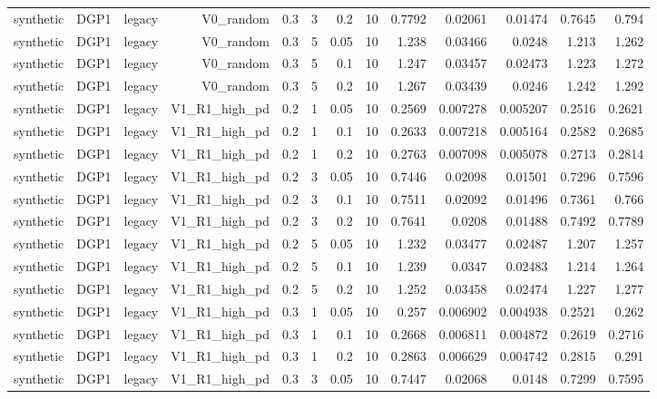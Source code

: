 \begin{table}[htbp]
\begin{tabular}{lrrrrrrrrrrrr}
    synthetic & DGP1 & legacy & V0\_random & 0.3 & 3 & 0.2 & 10 & 0.7792 & 0.02061 & 0.01474 & 0.7645 & 0.794 \\
    synthetic & DGP1 & legacy & V0\_random & 0.3 & 5 & 0.05 & 10 & 1.238 & 0.03466 & 0.0248 & 1.213 & 1.262 \\
    synthetic & DGP1 & legacy & V0\_random & 0.3 & 5 & 0.1 & 10 & 1.247 & 0.03457 & 0.02473 & 1.223 & 1.272 \\
    synthetic & DGP1 & legacy & V0\_random & 0.3 & 5 & 0.2 & 10 & 1.267 & 0.03439 & 0.0246 & 1.242 & 1.292 \\
    synthetic & DGP1 & legacy & V1\_R1\_high\_pd & 0.2 & 1 & 0.05 & 10 & 0.2569 & 0.007278 & 0.005207 & 0.2516 & 0.2621 \\
    synthetic & DGP1 & legacy & V1\_R1\_high\_pd & 0.2 & 1 & 0.1 & 10 & 0.2633 & 0.007218 & 0.005164 & 0.2582 & 0.2685 \\
    synthetic & DGP1 & legacy & V1\_R1\_high\_pd & 0.2 & 1 & 0.2 & 10 & 0.2763 & 0.007098 & 0.005078 & 0.2713 & 0.2814 \\
    synthetic & DGP1 & legacy & V1\_R1\_high\_pd & 0.2 & 3 & 0.05 & 10 & 0.7446 & 0.02098 & 0.01501 & 0.7296 & 0.7596 \\
    synthetic & DGP1 & legacy & V1\_R1\_high\_pd & 0.2 & 3 & 0.1 & 10 & 0.7511 & 0.02092 & 0.01496 & 0.7361 & 0.766 \\
    synthetic & DGP1 & legacy & V1\_R1\_high\_pd & 0.2 & 3 & 0.2 & 10 & 0.7641 & 0.0208 & 0.01488 & 0.7492 & 0.7789 \\
    synthetic & DGP1 & legacy & V1\_R1\_high\_pd & 0.2 & 5 & 0.05 & 10 & 1.232 & 0.03477 & 0.02487 & 1.207 & 1.257 \\
    synthetic & DGP1 & legacy & V1\_R1\_high\_pd & 0.2 & 5 & 0.1 & 10 & 1.239 & 0.0347 & 0.02483 & 1.214 & 1.264 \\
    synthetic & DGP1 & legacy & V1\_R1\_high\_pd & 0.2 & 5 & 0.2 & 10 & 1.252 & 0.03458 & 0.02474 & 1.227 & 1.277 \\
    synthetic & DGP1 & legacy & V1\_R1\_high\_pd & 0.3 & 1 & 0.05 & 10 & 0.257 & 0.006902 & 0.004938 & 0.2521 & 0.262 \\
    synthetic & DGP1 & legacy & V1\_R1\_high\_pd & 0.3 & 1 & 0.1 & 10 & 0.2668 & 0.006811 & 0.004872 & 0.2619 & 0.2716 \\
    synthetic & DGP1 & legacy & V1\_R1\_high\_pd & 0.3 & 1 & 0.2 & 10 & 0.2863 & 0.006629 & 0.004742 & 0.2815 & 0.291 \\
    synthetic & DGP1 & legacy & V1\_R1\_high\_pd & 0.3 & 3 & 0.05 & 10 & 0.7447 & 0.02068 & 0.0148 & 0.7299 & 0.7595 \\

\end{tabular}
\end{table}
